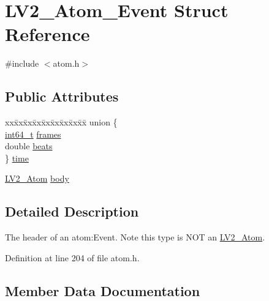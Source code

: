 \hypertarget{struct_l_v2___atom___event}{}\section{L\+V2\+\_\+\+Atom\+\_\+\+Event Struct Reference}
\label{struct_l_v2___atom___event}


{\ttfamily \#include $<$atom.\+h$>$}

\subsection*{Public Attributes}
\begin{DoxyCompactItemize}
\item 
\begin{tabbing}
xx\=xx\=xx\=xx\=xx\=xx\=xx\=xx\=xx\=\kill
union \{\\
\>\hyperlink{lib-src_2ffmpeg_2win32_2stdint_8h_a67a9885ef4908cb72ce26d75b694386c}{int64\_t} \hyperlink{struct_l_v2___atom___event_a255dbfc7b1fa24a2852de67ebf239c6d}{frames}\\
\>double \hyperlink{struct_l_v2___atom___event_a87293467e3d56022f36af63034a40041}{beats}\\
\} \hyperlink{struct_l_v2___atom___event_aebc047bffd25fcb780c8f6abbf973da9}{time}\\

\end{tabbing}\item 
\hyperlink{struct_l_v2___atom}{L\+V2\+\_\+\+Atom} \hyperlink{struct_l_v2___atom___event_a274e3113f8a11d44f6289a5546eadffb}{body}
\end{DoxyCompactItemize}


\subsection{Detailed Description}
The header of an atom\+:Event. Note this type is N\+OT an \hyperlink{struct_l_v2___atom}{L\+V2\+\_\+\+Atom}. 

Definition at line 204 of file atom.\+h.



\subsection{Member Data Documentation}
